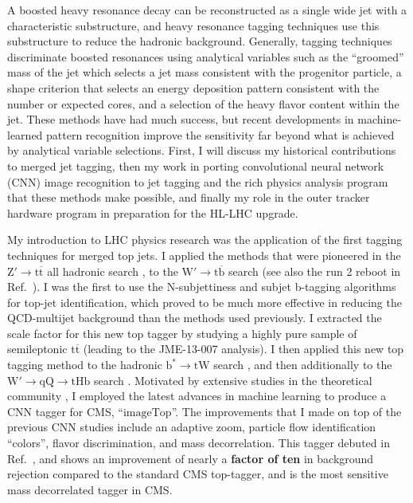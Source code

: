 \documentclass[12pt]{article}
\begin{document}
A boosted heavy resonance decay can be reconstructed as a single wide jet with
a characteristic substructure, and heavy resonance tagging techniques use this
substructure to reduce the hadronic background.  Generally, tagging techniques
discriminate boosted resonances using analytical variables such as the ``groomed''
mass of the jet which selects a jet mass consistent with the progenitor particle,
a shape criterion that selects an energy deposition pattern consistent with the
number or expected cores, and a selection of the heavy flavor content within the
jet.  These methods have had much success, but recent developments in machine-learned pattern recognition improve the sensitivity far beyond what is achieved
by analytical variable selections.  First, I will discuss my historical contributions to
merged jet tagging, then my work in porting convolutional neural network
(CNN) image recognition to jet tagging and the rich
physics analysis program that these methods make possible, and finally my role in
the outer tracker hardware program in preparation for the HL-LHC upgrade.

My introduction to LHC physics research was the application of the first tagging techniques
for merged top jets.  I applied the methods that were pioneered in the $\mathrm{Z' \to t\overline{t}}$
all hadronic
search \cite{Chatrchyan:2013lca}, to the $\mathrm{W' \to t\overline{b}}$ search
\cite{Khachatryan:2015edz} (see also the run 2 reboot in Ref.~\cite{Sirunyan:2017ukk}).
I was the first to use the N-subjettiness and subjet b-tagging algorithms for top-jet identification, which
proved to be much more effective in reducing the
QCD-multijet background than the methods used previously.
I extracted the scale factor for this new top tagger by studying a highly
pure sample of semileptonic $\mathrm{t\overline{t}}$ (leading to the JME-13-007 \cite{CMS:2014fya} analysis).
 I then applied this new top tagging method to the hadronic $\mathrm{b^* \to tW}$
 search \cite{Khachatryan:2015mta}, and then additionally to
the $\mathrm{W' \to qQ \to tHb}$ search \cite{Sirunyan:2018fki}.  Motivated by extensive
studies in the theoretical community \cite{Kasieczka:2017nvn,Macaluso:2018tck}, I
employed the latest advances in machine learning to produce a
CNN tagger for CMS, ``$\mathrm{imageTop}$''.  The improvements that I made on top of the previous
CNN studies include an adaptive zoom, particle flow identification ``colors'', flavor
discrimination, and mass decorrelation.  This tagger debuted in Ref.~\cite{CMS:2019gpd},
and shows an improvement of nearly a {\bf factor of ten} in background rejection compared to the standard
CMS top-tagger, and is the most sensitive mass decorrelated tagger in CMS.
\end{document}
